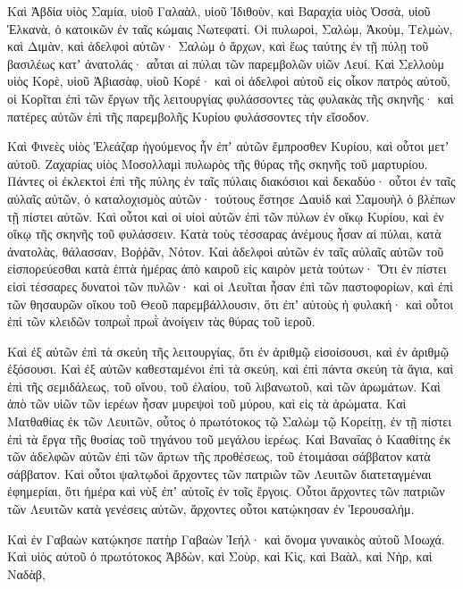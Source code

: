 {Καὶ Ἀβδία υἱὸς Σαμία, υἱοῦ Γαλαὰλ, υἱοῦ Ἰδιθοὺν, καὶ Βαραχία υἱὸς Ὀσσὰ, υἱοῦ Ἑλκανὰ, ὁ κατοικῶν ἐν ταῖς κώμαις Νωτεφατί.
Οἱ πυλωροὶ, Σαλὼμ, Ἀκοὺμ, Τελμὼν, καὶ Διμὰν, καὶ ἀδελφοὶ αὐτῶν· Σαλὼμ ὁ ἄρχων,
καὶ ἕως ταύτης ἐν τῇ πύλῃ τοῦ βασιλέως κατʼ ἀνατολάς· αὗται αἱ πύλαι τῶν παρεμβολῶν υἱῶν Λευί.
Καὶ Σελλοὺμ υἱὸς Κορὲ, υἱοῦ Ἀβιασὰφ, υἱοῦ Κορέ· καὶ οἱ ἀδελφοὶ αὐτοῦ εἰς οἶκον πατρὸς αὐτοῦ, οἱ Κορῖται ἐπὶ τῶν ἔργων τῆς λειτουργίας φυλάσσοντες τὰς φυλακὰς τῆς σκηνῆς· καὶ πατέρες αὐτῶν ἐπὶ τῆς παρεμβολῆς Κυρίου φυλάσσοντες τὴν εἴσοδον.
\par }{\PP {}Καὶ Φινεὲς υἱὸς Ἐλεάζαρ ἡγούμενος ἦν ἐπʼ αὐτῶν ἔμπροσθεν Κυρίου, καὶ οὗτοι μετʼ αὐτοῦ.
Ζαχαρίας υἱὸς Μοσολλαμὶ πυλωρὸς τῆς θύρας τῆς σκηνῆς τοῦ μαρτυρίου.
Πάντες οἱ ἐκλεκτοὶ ἐπὶ τῆς πύλης ἐν ταῖς πύλαις διακόσιοι καὶ δεκαδύο· οὗτοι ἐν ταῖς αὐλαῖς αὐτῶν, ὁ καταλοχισμὸς αὐτῶν· τούτους ἔστησε Δαυὶδ καὶ Σαμουὴλ ὁ βλέπων τῇ πίστει αὐτῶν.
Καὶ οὗτοι καὶ οἱ υἱοὶ αὐτῶν ἐπὶ τῶν πύλων ἐν οἴκῳ Κυρίου, καὶ ἐν οἴκῳ τῆς σκηνῆς τοῦ φυλάσσειν.
Κατὰ τοὺς τέσσαρας ἀνέμους ἦσαν αἱ πύλαι, κατὰ ἀνατολὰς, θάλασσαν, Βοῤῥᾶν, Νότον.
Καὶ ἀδελφοὶ αὐτῶν ἐν ταῖς αὐλαῖς αὐτῶν τοῦ εἰσπορεύεσθαι κατὰ ἑπτὰ ἡμέρας ἀπὸ καιροῦ εἰς καιρὸν μετὰ τούτων·
Ὅτι ἐν πίστει εἰσὶ τέσσαρες δυνατοὶ τῶν πυλῶν· καὶ οἱ Λευῖται ἦσαν ἐπὶ τῶν παστοφορίων, καὶ ἐπὶ τῶν θησαυρῶν οἴκου τοῦ Θεοῦ παρεμβάλλουσιν,
ὅτι ἐπʼ αὐτοὺς ἡ φυλακή· καὶ οὗτοι ἐπὶ τῶν κλειδῶν τοπρωῒ πρωῒ ἀνοίγειν τὰς θύρας τοῦ ἱεροῦ.
\par }{\PP {}Καὶ ἐξ αὐτῶν ἐπὶ τὰ σκεύη τῆς λειτουργίας, ὅτι ἐν ἀριθμῷ εἰσοίσουσι, καὶ ἐν ἀριθμῷ ἐξόσουσι.
Καὶ ἐξ αὐτῶν καθεσταμένοι ἐπὶ τὰ σκεύη, καὶ ἐπὶ πάντα σκεύη τὰ ἅγια, καὶ ἐπὶ τῆς σεμιδάλεως, τοῦ οἴνου, τοῦ ἐλαίου, τοῦ λιβανωτοῦ, καὶ τῶν ἀρωμάτων.
Καὶ ἀπὸ τῶν υἱῶν τῶν ἱερέων ἦσαν μυρεψοὶ τοῦ μύρου, καὶ εἰς τὰ ἀρώματα.
Καὶ Ματθαθίας ἐκ τῶν Λευιτῶν, οὗτος ὁ πρωτότοκος τῷ Σαλὼμ τῷ Κορείτῃ, ἐν τῇ πίστει ἐπὶ τὰ ἔργα τῆς θυσίας τοῦ τηγάνου τοῦ μεγάλου ἱερέως.
Καὶ Βαναΐας ὁ Κααθίτης ἐκ τῶν ἀδελφῶν αὐτῶν ἐπὶ τῶν ἄρτων τῆς προθέσεως, τοῦ ἑτοιμάσαι σάββατον κατὰ σάββατον.
Καὶ οὗτοι ψαλτῳδοὶ ἄρχοντες τῶν πατριῶν τῶν Λευιτῶν διατεταγμέναι ἐφημερίαι, ὅτι ἡμέρα καὶ νὺξ ἐπʼ αὐτοῖς ἐν τοῖς ἔργοις.
Οὗτοι ἄρχοντες τῶν πατριῶν τῶν Λευιτῶν κατὰ γενέσεις αὐτῶν, ἄρχοντες οὗτοι κατῴκησαν ἐν Ἱερουσαλήμ.
\par }{\PP {}Καὶ ἐν Γαβαὼν κατῴκησε πατὴρ Γαβαὼν Ἰεήλ· καὶ ὄνομα γυναικὸς αὐτοῦ Μοωχά.
Καὶ υἱὸς αὐτοῦ ὁ πρωτότοκος Ἀβδὼν, καὶ Σοὺρ, καὶ Κὶς, καὶ Βαὰλ, καὶ Νὴρ, καὶ Ναδὰβ,
}
